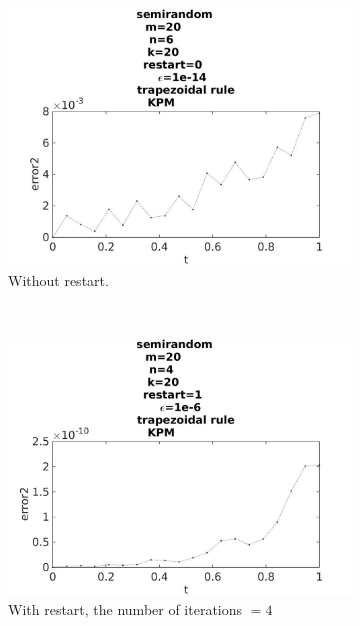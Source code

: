 \begin{figure}[H]
        \begin{subfigure}[b]{0.3\textwidth}
                \includegraphics[width=\textwidth]{../MATLAB/fig/errorarnrestart0.jpg}
                \caption{  Without restart. }
                \label{fig:errorarnrestart0}
        \end{subfigure}%
        ~
        \begin{subfigure}[b]{0.3\textwidth}
                \includegraphics[width=\textwidth]{../MATLAB/fig/errorarnrestart2.jpg}
                \caption{ With restart, the number of iterations $ = 4$ }
                \label{fig:errorarnrestart2}
        \end{subfigure}
        ~
        \begin{subfigure}[b]{0.3\textwidth}

\end{subfigure}
\end{figure}
